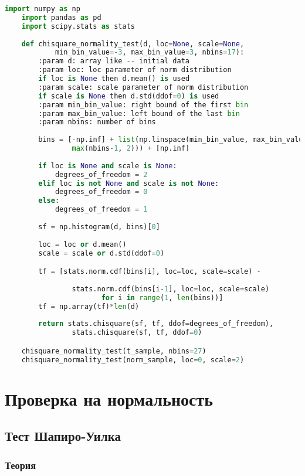 \begin{lstlisting}[language=Python]
	import numpy as np
	import pandas as pd
	import scipy.stats as stats
	
	def chisquare_normality_test(d, loc=None, scale=None, 
			min_bin_value=-3, max_bin_value=3, nbins=17):
	    :param d: array like -- initial data
	    :param loc: loc parameter of norm distribution
	    if loc is None then d.mean() is used
	    :param scale: scale parameter of norm distribution
	    if scale is None then d.std(ddof=0) is used
	    :param min_bin_value: right bound of the first bin
	    :param max_bin_value: left bound of the last bin
	    :param nbins: number of bins
    
	    bins = [-np.inf] + list(np.linspace(min_bin_value, max_bin_value, 
	    		max(nbins-1, 2))) + [np.inf]
	    
	    if loc is None and scale is None:
	        degrees_of_freedom = 2
	    elif loc is not None and scale is not None:
	        degrees_of_freedom = 0
	    else:
	        degrees_of_freedom = 1
	        
	    sf = np.histogram(d, bins)[0]
	    
	    loc = loc or d.mean()
	    scale = scale or d.std(ddof=0)

	    tf = [stats.norm.cdf(bins[i], loc=loc, scale=scale) - 
	    		
	    		stats.norm.cdf(bins[i-1], loc=loc, scale=scale) 
	                   for i in range(1, len(bins))]
	    tf = np.array(tf)*len(d)
	    
	    return stats.chisquare(sf, tf, ddof=degrees_of_freedom), 
	    		stats.chisquare(sf, tf, ddof=0)

	chisquare_normality_test(t_sample, nbins=27)
	chisquare_normality_test(norm_sample, loc=0, scale=2)
\end{lstlisting}

\section{Проверка на нормальность}\label{cha:compl/sec:norm}

\subsection{Тест Шапиро-Уилка}\label{cha:compl/sec:norm/subsec:shapiro}

\subsubsection*{Теория}\label{cha:compl/sec:norm/subsec:shapiro/subsubsection:theory}

